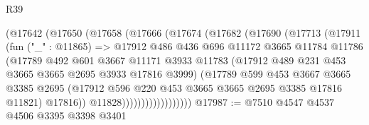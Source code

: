 \begin{lexlean}{R39}
\begin{coremodule}
                    (@17642
                      (@17650
                        (@17658
                          (@17666
                            (@17674
                              (@17682
                                (@17690
                                  (@17713
                                    (@17911
                                      (fun ("_" : @11865) =>
                                      @17912
                                        @486
                                        @436
                                        @696
                                        @11172
                                        @3665
                                        @11784
                                        @11786
                                        (@17789
                                          @492
                                          @601
                                          @3667
                                          @11171
                                          @3933
                                          @11783
                                          (@17912
                                            @489
                                            @231
                                            @453
                                            @3665
                                            @3665
                                            @2695
                                            @3933
                                            @17816
                                            @3999)
                                          (@17789
                                            @599
                                            @453
                                            @3667
                                            @3665
                                            @3385
                                            @2695
                                            (@17912
                                              @596
                                              @220
                                              @453
                                              @3665
                                              @3665
                                              @2695
                                              @3385
                                              @17816
                                              @11821)
                                            @17816))
                                        @11828))))))))))))))))))
@17987 := @7510 @4547 @4537 @4506 @3395 @3398 @3401

\end{coremodule}
\end{lexlean}
